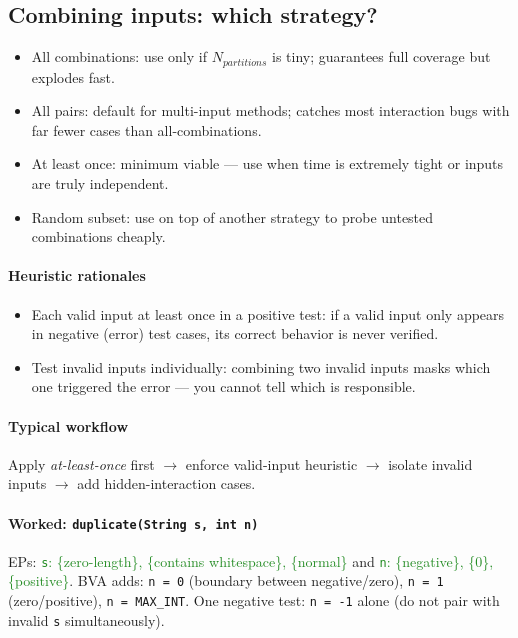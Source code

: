 \subsection{Combining inputs: which strategy?}
\begin{itemize}
  \item \textcolor{Bittersweet}{All combinations}: use only if $N_{partitions}$ is tiny; guarantees full coverage but explodes fast.
  \item \textcolor{Bittersweet}{All pairs}: default for multi-input methods; catches most interaction bugs with far fewer cases than all-combinations.
  \item \textcolor{Bittersweet}{At least once}: minimum viable — use when time is extremely tight or inputs are truly independent.
  \item \textcolor{Bittersweet}{Random subset}: use on top of another strategy to probe untested combinations cheaply.
\end{itemize}

\paragraph{Heuristic rationales}
\begin{itemize}
  \item \textcolor{Bittersweet}{Each valid input at least once in a positive test}: if a valid input only appears in negative (error) test cases, its correct behavior is never verified.
  \item \textcolor{Bittersweet}{Test invalid inputs individually}: combining two invalid inputs masks which one triggered the error — you cannot tell which is responsible.
\end{itemize}

\paragraph{Typical workflow}
Apply \textit{at-least-once} first $\to$ enforce valid-input heuristic $\to$ isolate invalid inputs $\to$ add hidden-interaction cases.

\paragraph{Worked: \texttt{duplicate(String s, int n)}}
EPs: \textcolor{ForestGreen}{\texttt{s}: \{zero-length\}, \{contains whitespace\}, \{normal\}} and \textcolor{ForestGreen}{\texttt{n}: \{negative\}, \{0\}, \{positive\}}.
BVA adds: \texttt{n = 0} (boundary between negative/zero), \texttt{n = 1} (zero/positive), \texttt{n = MAX\_INT}.
One negative test: \texttt{n = -1} alone (do not pair with invalid \texttt{s} simultaneously).
